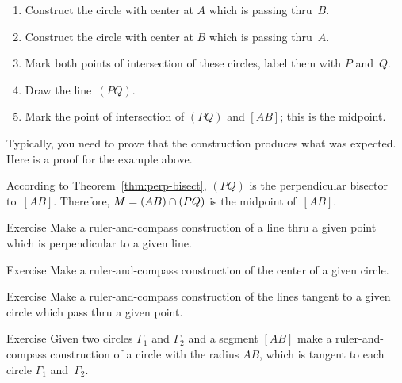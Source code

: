 \begin{enumerate}[1.]
\item Construct the circle 
with center at $A$ 
which is passing thru~$B$.
\item Construct the circle 
with center at $B$ 
which is passing thru~$A$.
\item Mark both points of intersection of these circles, label them with $P$ and~$Q$.
\item Draw the line~$(PQ)$.
\item Mark the point of intersection of $(PQ)$ and $[AB]$; this is the midpoint.
\end{enumerate}

\medskip

Typically, you need to prove that the construction produces what was expected. Here is a proof for the example above.

According to Theorem~\ref{thm:perp-bisect}, $(PQ)$ is the perpendicular bisector to~$[AB]$.
Therefore, $M\z=(AB)\cap(PQ)$ is the midpoint of~$[AB]$. 
\qeds

\begin{thm}{Exercise}\label{ex:construction-perpendicular}
Make a ruler-and-compass construction of a line thru a given point which is perpendicular to a given line.
\end{thm}

\begin{thm}{Exercise}\label{ex:center}
Make a ruler-and-compass construction of the center 
of a given circle.
\end{thm}

\begin{thm}{Exercise}\label{ex:tangent}
Make a ruler-and-compass construction of the lines tangent to a given circle which pass thru a given point.
\end{thm}

\begin{thm}{Exercise}\label{ex:tangent-circle}
Given two circles $\Gamma_1$ and $\Gamma_2$ and a segment $[AB]$
make a ruler-and-compass construction of a circle with the radius $AB$, 
which is tangent to each circle $\Gamma_1$ and~$\Gamma_2$.
\end{thm}


